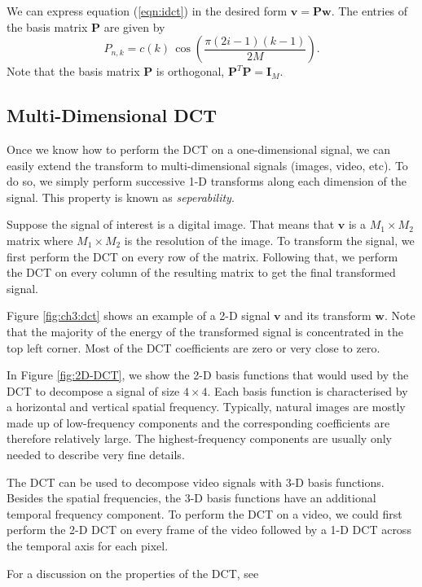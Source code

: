 We can express equation (\ref{eqn:idct}) in the desired form $\bm v=\bm P\bm w$.
The entries of the basis matrix $\bm P$ are given by
\begin{equation}
  \label{eqn:idct_basis}
  P_{n,k} = c(k)\, \cos\left(\frac{\pi(2i-1)(k-1)}{2M}\right).
\end{equation}
Note that the basis matrix $\bm P$ is orthogonal, $\bm P^T\bm P=\bm I_M$.

\subsection{Multi-Dimensional DCT}
Once we know how to perform the DCT on a one-dimensional signal, we can easily extend the transform to multi-dimensional signals (images, video, etc).
To do so, we simply perform successive 1-D transforms along each dimension of the signal.
This property is known as \emph{seperability}.

Suppose the signal of interest is a digital image.
That means that $\bm v$ is a $M_1\times M_2$ matrix where $M_1\times M_2$ is the resolution of the image.
To transform the signal, we first perform the DCT on every row of the matrix.
Following that, we perform the DCT on every column of the resulting matrix to get the final transformed signal.

Figure \ref{fig:ch3:dct} shows an example of a 2-D signal $\bm v$ and its transform $\bm w$.
Note that the majority of the energy of the transformed signal is concentrated in the top left corner.
Most of the DCT coefficients are zero or very close to zero.

In Figure \ref{fig:2D-DCT}, we show the 2-D basis functions that would used by the DCT to decompose a signal of size $4\times 4$.
Each basis function is characterised by a horizontal and vertical spatial frequency.
Typically, natural images are mostly made up of low-frequency components and the corresponding coefficients are therefore relatively large.
The highest-frequency components are usually only needed to describe very fine details.

The DCT can be used to decompose video signals with 3-D basis functions. 
Besides the spatial frequencies, the 3-D basis functions have an additional temporal frequency component.
To perform the DCT on a video, we could first perform the 2-D DCT on every frame of the video followed by a 1-D DCT across the temporal axis for each pixel.

For a discussion on the properties of the DCT, see \cite{khayam2003}

